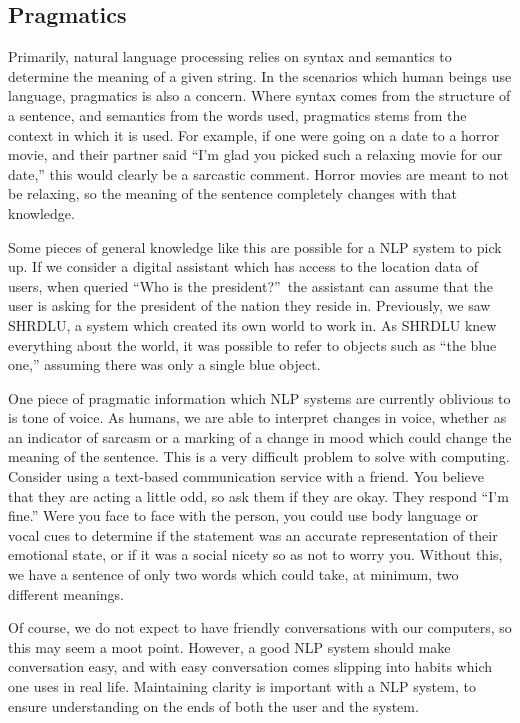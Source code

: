 \subsection{Pragmatics}
Primarily, natural language processing relies on syntax and semantics to determine the meaning of a given string. In the scenarios which human beings use language, pragmatics is also a concern. Where syntax comes from the structure of a sentence, and semantics from the words used, pragmatics stems from the context in which it is used. For example, if one were going on a date to a horror movie, and their partner said ``I'm glad you picked such a relaxing movie for our date,'' this would clearly be a sarcastic comment. Horror movies are meant to not be relaxing, so the meaning of the sentence completely changes with that knowledge.

Some pieces of general knowledge like this are possible for a NLP system to pick up. If we consider a digital assistant which has access to the location data of users, when queried ``Who is the president?''\ the assistant can assume that the user is asking for the president of the nation they reside in. Previously, we saw SHRDLU, a system which created its own world to work in. As SHRDLU knew everything about the world, it was possible to refer to objects such as ``the blue one,'' assuming there was only a single blue object.

One piece of pragmatic information which NLP systems are currently oblivious to is tone of voice. As humans, we are able to interpret changes in voice, whether as an indicator of sarcasm or a marking of a change in mood which could change the meaning of the sentence. This is a very difficult problem to solve with computing. Consider using a text-based communication service with a friend. You believe that they are acting a little odd, so ask them if they are okay. They respond ``I'm fine.'' Were you face to face with the person, you could use body language or vocal cues to determine if the statement was an accurate representation of their emotional state, or if it was a social nicety so as not to worry you. Without this, we have a sentence of only two words which could take, at minimum, two different meanings.

Of course, we do not expect to have friendly conversations with our computers, so this may seem a moot point. However, a good NLP system should make conversation easy, and with easy conversation comes slipping into habits which one uses in real life. Maintaining clarity is important with a NLP system, to ensure understanding on the ends of both the user and the system.


